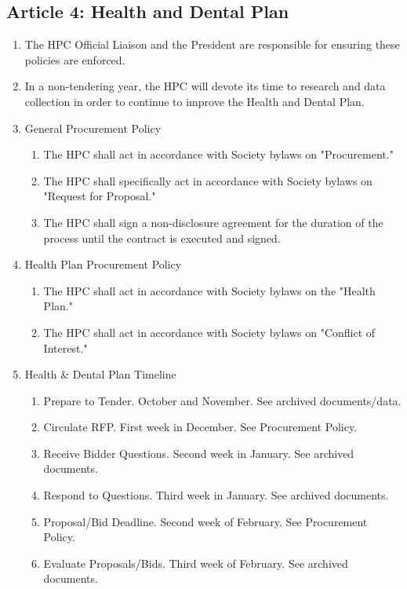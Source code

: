 \subsection{Article 4: Health and Dental Plan}
\begin{enumerate} [label*=\arabic*., align=left]	
\item The HPC Official Liaison and the President are responsible for ensuring these policies are enforced.
\item In a non-tendering year, the HPC will devote its time to research and data collection in order to continue to improve the Health and Dental Plan.
\item General Procurement Policy
\begin{enumerate}[label*=\arabic*., align=left]	
\item The HPC shall act in accordance with Society bylaws on "Procurement."
\item The HPC shall specifically act in accordance with Society bylaws on "Request for Proposal."
\item The HPC shall sign a non-disclosure agreement for the duration of the process until the
contract is executed and signed.
\end{enumerate}
\item Health Plan Procurement Policy
\begin{enumerate} [label*=\arabic*., align=left]	
\item The HPC shall act in accordance with Society bylaws on the "Health Plan."
\item The HPC shall act in accordance with Society bylaws on "Conflict of Interest."
\end{enumerate}
\item Health \& Dental Plan Timeline
\begin{enumerate}[label*=\arabic*., align=left]	
\item Prepare to Tender. October and November. See archived documents/data.
\item Circulate RFP. First week in December. See Procurement Policy.
\item Receive Bidder Questions. Second week in January. See archived documents.
\item Respond to Questions. Third week in January. See archived documents.
\item Proposal/Bid Deadline. Second week of February. See Procurement Policy.
\item Evaluate Proposals/Bids. Third week of February. See archived documents.

\end{enumerate}
\end{enumerate}
